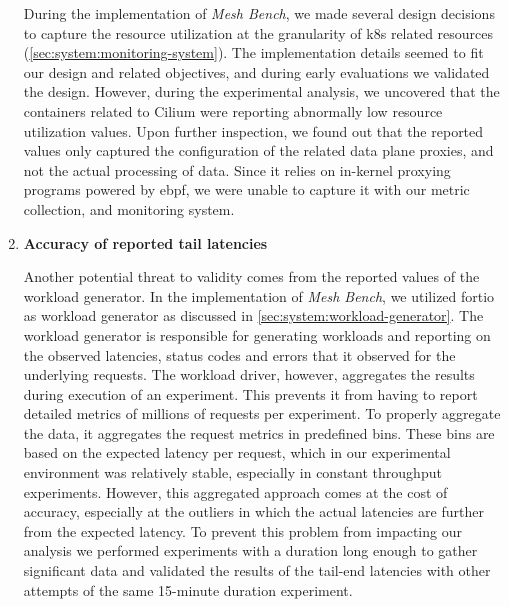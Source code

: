 \begin{enumerate}
    During the implementation of \textit{Mesh Bench}, we made several design decisions to capture the resource utilization at the granularity of \gls{k8s} related resources (\cref{sec:system:monitoring-system}). The implementation details seemed to fit our design and related objectives, and during early evaluations we validated the design. However, during the experimental analysis, we uncovered that the containers related to Cilium were reporting abnormally low resource utilization values. Upon further inspection, we found out that the reported values only captured the configuration of the related data plane proxies, and not the actual processing of data. Since it relies on in-kernel proxying programs powered by \gls{ebpf}, we were unable to capture it with our metric collection, and monitoring system.
    
    \item \textbf{Accuracy of reported tail latencies}
    
    Another potential threat to validity comes from the reported values of the workload generator. In the implementation of \textit{Mesh Bench}, we utilized fortio as workload generator as discussed in \cref{sec:system:workload-generator}. The workload generator is responsible for generating workloads and reporting on the observed latencies, status codes and errors that it observed for the underlying requests. The workload driver, however, aggregates the results during execution of an experiment. This prevents it from having to report detailed metrics of millions of requests per experiment. To properly aggregate the data, it aggregates the request metrics in predefined bins. These bins are based on the expected latency per request, which in our experimental environment was relatively stable, especially in constant throughput experiments. However, this aggregated approach comes at the cost of accuracy, especially at the outliers in which the actual latencies are further from the expected latency. To prevent this problem from impacting our analysis we performed experiments with a duration long enough to gather significant data and validated the results of the tail-end latencies with other attempts of the same 15-minute duration experiment.
\end{enumerate}